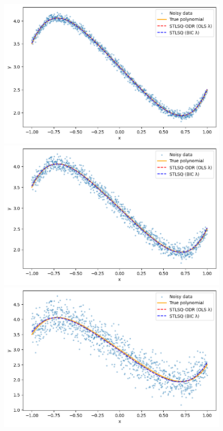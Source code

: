 \begin{figure}
\centering
\begin{minipage}{0.45\textwidth}
    \centering
    \includegraphics[width=\linewidth]{MSc_Statistics_Research_Report_Template/images/2 0.05.png}
\end{minipage}
\begin{minipage}{0.45\textwidth}
    \centering
    \includegraphics[width=\linewidth]{MSc_Statistics_Research_Report_Template/images/2 0.1.png}
\end{minipage}
\begin{minipage}{0.45\textwidth}
    \centering
    \includegraphics[width=\linewidth]{MSc_Statistics_Research_Report_Template/images/2 0.3.png} 

\end{minipage}
\end{figure}
